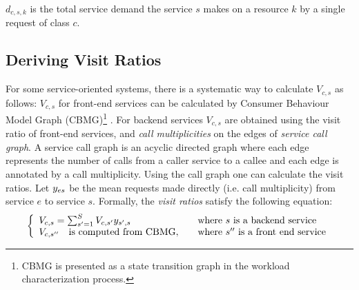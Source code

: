   $d_{c,s,k}$ is the total service demand the service $s$ makes on a resource $k$
  by a single request of class $c$. 
 \subsection{Deriving Visit Ratios}    
 For some service-oriented systems, there is a systematic way to calculate  $V_{c,s}$ as follows: $V_{c,s}$ for front-end services can be calculated by Consumer Behaviour Model Graph (CBMG)\footnote{CBMG is presented as a state transition graph in the workload characterization process.}  \cite{menasce2004composing}. 
    For backend services  $V_{c,s}$ are obtained using the visit ratio of front-end services, and \textit{call multiplicities}  on the edges of \textit{service call graph}. 
      A service call graph is an acyclic directed graph where each edge represents the number of calls from a caller service to a callee and each edge is annotated by a call multiplicity. 
Using the call graph one can calculate the visit ratios.
Let $y_{es}$ be the mean requests made directly (i.e. call multiplicity) from service $e$ to service $s$. 
 Formally, the \textit{visit ratios} satisfy the following equation:  
\[  \left\{ 
  \begin{array}{l l}
   V_{c,s}=\sum_{s'=1}^{S} V_{c,s'} y_{s',s} & \quad \text{where $s$ is a backend service}\\
    V_{c,s''}  \quad \text{is computed from CBMG}, & \quad  \text{where $s''$ is a front end service}
  \end{array} \right.\]

